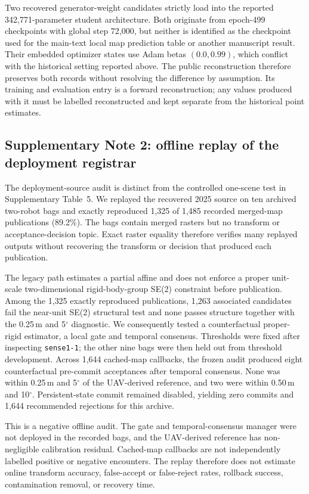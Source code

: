 \documentclass[11pt]{article}
\begin{document}
Two recovered generator-weight candidates strictly load into the reported 342{,}771-parameter student architecture. Both originate from epoch-499 checkpoints with global step 72{,}000, but neither is identified as the checkpoint used for the main-text local map prediction table or another manuscript result. Their embedded optimizer states use Adam betas $(0.0,0.99)$, which conflict with the historical setting reported above. The public reconstruction therefore preserves both records without resolving the difference by assumption. Its training and evaluation entry is a forward reconstruction; any values produced with it must be labelled reconstructed and kept separate from the historical point estimates.

\subsection*{Supplementary Note 2: offline replay of the deployment registrar}
\vspace{-0.25em}
The deployment-source audit is distinct from the controlled one-scene test in Supplementary Table~5. We replayed the recovered 2025 source on ten archived two-robot bags and exactly reproduced 1{,}325 of 1{,}485 recorded merged-map publications (89.2\%). The bags contain merged rasters but no transform or acceptance-decision topic. Exact raster equality therefore verifies many replayed outputs without recovering the transform or decision that produced each publication.

The legacy path estimates a partial affine and does not enforce a proper unit-scale two-dimensional rigid-body-group SE(2) constraint before publication. Among the 1{,}325 exactly reproduced publications, 1{,}263 associated candidates fail the near-unit SE(2) structural test and none passes structure together with the 0.25\,m and 5$^{\circ}$ diagnostic. We consequently tested a counterfactual proper-rigid estimator, a local gate and temporal consensus. Thresholds were fixed after inspecting \texttt{sense1-1}; the other nine bags were then held out from threshold development. Across 1{,}644 cached-map callbacks, the frozen audit produced eight counterfactual pre-commit acceptances after temporal consensus. None was within 0.25\,m and 5$^{\circ}$ of the UAV-derived reference, and two were within 0.50\,m and 10$^{\circ}$. Persistent-state commit remained disabled, yielding zero commits and 1{,}644 recommended rejections for this archive.

This is a negative offline audit. The gate and temporal-consensus manager were not deployed in the recorded bags, and the UAV-derived reference has non-negligible calibration residual. Cached-map callbacks are not independently labelled positive or negative encounters. The replay therefore does not estimate online transform accuracy, false-accept or false-reject rates, rollback success, contamination removal, or recovery time.
\end{document}
